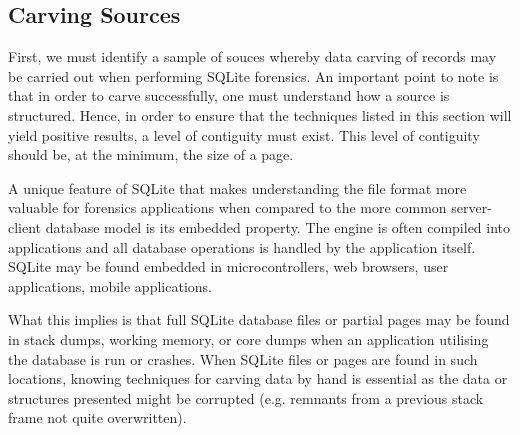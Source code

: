 \documentclass{article}
\begin{document}
\subsection{Carving Sources}

First, we must identify a sample of souces whereby data carving of records may be carried out when performing SQLite forensics. An important point to note is that in order to carve successfully, one must understand how a source is structured. Hence, in order to ensure that the techniques listed in this section will yield positive results, a level of contiguity must exist. This level of contiguity should be, at the minimum, the size of a page.

A unique feature of SQLite that makes understanding the file format more valuable for forensics applications when compared to the more common server-client database model is its embedded property. The engine is often compiled into applications and all database operations is handled by the application itself. SQLite may be found embedded in microcontrollers, web browsers, user applications, mobile applications.

What this implies is that full SQLite database files or partial pages may be found in stack dumps, working memory, or core dumps when an application utilising the database is run or crashes. When SQLite files or pages are found in such locations, knowing techniques for carving data by hand is essential as the data or structures presented might be corrupted (e.g. remnants from a previous stack frame not quite overwritten). 
\end{document}
